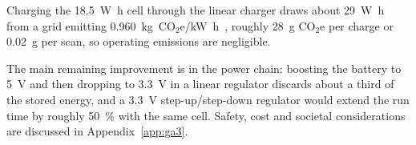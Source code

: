 Charging the \SI{18.5}{\watt\hour} cell through the linear charger draws about \SI{29}{\watt\hour} from a grid emitting
\SI{0.960}{\kilo\gram}~CO$_2$e/\si{\kilo\watt\hour}~\cite{env_dffe_gef2024},
roughly \SI{28}{\gram} CO$_2$e per charge or \SI{0.02}{\gram} per scan, so
operating emissions are negligible.

The main remaining improvement is in the power chain: boosting the battery to
\SI{5}{\volt} and then dropping to \SI{3.3}{\volt} in a linear regulator discards about a third of
the stored energy, and a \SI{3.3}{\volt} step-up/step-down regulator would extend the run time by roughly
\SI{50}{\percent} with the same cell. Safety, cost and societal
considerations are discussed in Appendix~\ref{app:ga3}.
